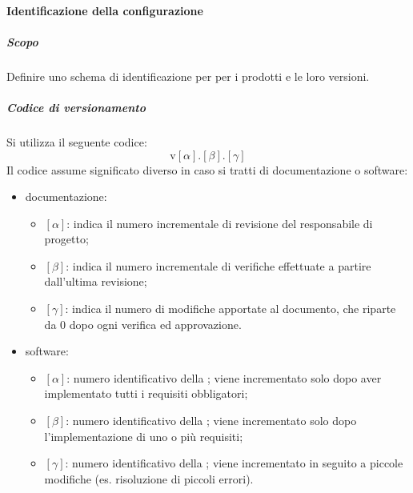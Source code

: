        \paragraph{Identificazione della configurazione}
            \subparagraph{Scopo}
            Definire uno schema di identificazione per per i prodotti e le loro versioni.

            \subparagraph{Codice di versionamento}
            Si utilizza il seguente codice:
            \[
            \text{v}[\alpha].[\beta].[\gamma]
            \]
            Il codice assume significato diverso in caso si tratti di documentazione o software:
            \begin{itemize}
                \item documentazione:
                \begin{itemize}
                	\item \([\alpha]\): indica il numero incrementale di revisione del responsabile
                	di progetto;
                	\item \([\beta]\): indica il numero incrementale di verifiche effettuate a partire dall'ultima revisione;
                	\item \([\gamma]\): indica il numero di modifiche apportate al documento, che
                	riparte da 0 dopo ogni verifica ed approvazione.
                \end{itemize}

                \item software:
                \begin{itemize}
                    \item \([\alpha]\): numero identificativo della ; viene incrementato solo dopo aver implementato tutti i requisiti obbligatori;
                    \item \([\beta]\): numero identificativo della ; viene incrementato solo dopo l'implementazione di uno o più requisiti;
                    \item \([\gamma]\): numero identificativo della ; viene incrementato in seguito a piccole modifiche (es. risoluzione di piccoli errori).
                \end{itemize}
            \end{itemize}

